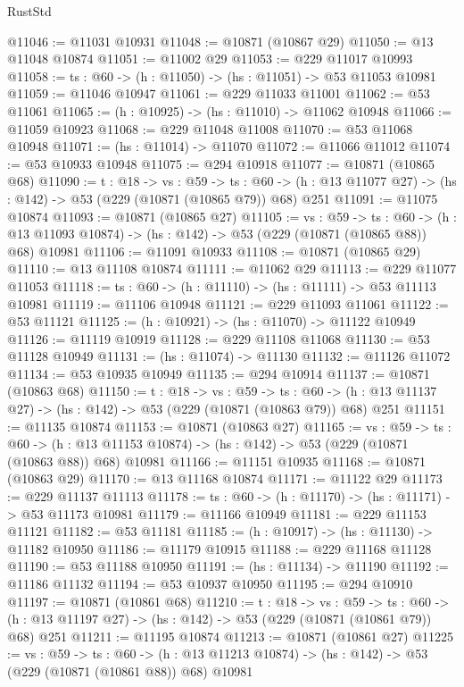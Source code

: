 \begin{lexlean}{RustStd}
\begin{coremodule}
@11046 := @11031 @10931
@11048 := @10871 (@10867 @29)
@11050 := @13 @11048 @10874
@11051 := @11002 @29
@11053 := @229 @11017 @10993
@11058 := {ts : @60} -> (h : @11050) -> (hs : @11051) -> @53 @11053 @10981
@11059 := @11046 @10947
@11061 := @229 @11033 @11001
@11062 := @53 @11061
@11065 := (h : @10925) -> (hs : @11010) -> @11062 @10948
@11066 := @11059 @10923
@11068 := @229 @11048 @11008
@11070 := @53 @11068 @10948
@11071 := (hs : @11014) -> @11070
@11072 := @11066 @11012
@11074 := @53 @10933 @10948
@11075 := @294 @10918
@11077 := @10871 (@10865 @68)
@11090 := {t : @18} ->
  {vs : @59} ->
  {ts : @60} -> (h : @13 @11077 @27) -> (hs : @142) -> @53 (@229 (@10871 (@10865 @79)) @68) @251
@11091 := @11075 @10874
@11093 := @10871 (@10865 @27)
@11105 := {vs : @59} ->
  {ts : @60} ->
  (h : @13 @11093 @10874) -> (hs : @142) -> @53 (@229 (@10871 (@10865 @88)) @68) @10981
@11106 := @11091 @10933
@11108 := @10871 (@10865 @29)
@11110 := @13 @11108 @10874
@11111 := @11062 @29
@11113 := @229 @11077 @11053
@11118 := {ts : @60} -> (h : @11110) -> (hs : @11111) -> @53 @11113 @10981
@11119 := @11106 @10948
@11121 := @229 @11093 @11061
@11122 := @53 @11121
@11125 := (h : @10921) -> (hs : @11070) -> @11122 @10949
@11126 := @11119 @10919
@11128 := @229 @11108 @11068
@11130 := @53 @11128 @10949
@11131 := (hs : @11074) -> @11130
@11132 := @11126 @11072
@11134 := @53 @10935 @10949
@11135 := @294 @10914
@11137 := @10871 (@10863 @68)
@11150 := {t : @18} ->
  {vs : @59} ->
  {ts : @60} -> (h : @13 @11137 @27) -> (hs : @142) -> @53 (@229 (@10871 (@10863 @79)) @68) @251
@11151 := @11135 @10874
@11153 := @10871 (@10863 @27)
@11165 := {vs : @59} ->
  {ts : @60} ->
  (h : @13 @11153 @10874) -> (hs : @142) -> @53 (@229 (@10871 (@10863 @88)) @68) @10981
@11166 := @11151 @10935
@11168 := @10871 (@10863 @29)
@11170 := @13 @11168 @10874
@11171 := @11122 @29
@11173 := @229 @11137 @11113
@11178 := {ts : @60} -> (h : @11170) -> (hs : @11171) -> @53 @11173 @10981
@11179 := @11166 @10949
@11181 := @229 @11153 @11121
@11182 := @53 @11181
@11185 := (h : @10917) -> (hs : @11130) -> @11182 @10950
@11186 := @11179 @10915
@11188 := @229 @11168 @11128
@11190 := @53 @11188 @10950
@11191 := (hs : @11134) -> @11190
@11192 := @11186 @11132
@11194 := @53 @10937 @10950
@11195 := @294 @10910
@11197 := @10871 (@10861 @68)
@11210 := {t : @18} ->
  {vs : @59} ->
  {ts : @60} -> (h : @13 @11197 @27) -> (hs : @142) -> @53 (@229 (@10871 (@10861 @79)) @68) @251
@11211 := @11195 @10874
@11213 := @10871 (@10861 @27)
@11225 := {vs : @59} ->
  {ts : @60} ->
  (h : @13 @11213 @10874) -> (hs : @142) -> @53 (@229 (@10871 (@10861 @88)) @68) @10981

\end{coremodule}
\end{lexlean}
